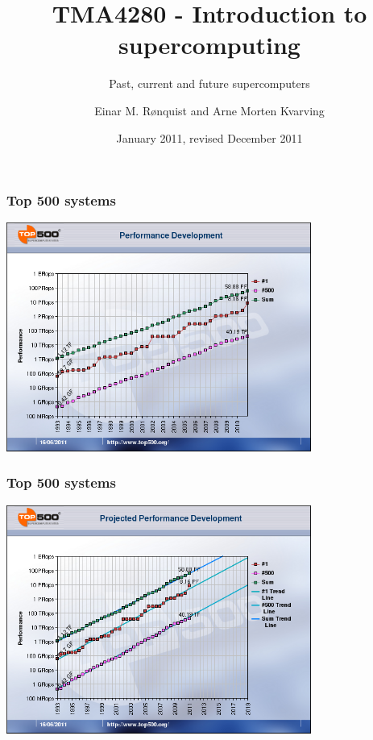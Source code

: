 \documentclass{beamer}
\title{TMA4280 - Introduction to supercomputing}
\subtitle{Past, current and future supercomputers}
\author{Einar M. R{\o}nquist and Arne Morten Kvarving}
\institute{NTNU and SINTEF ICT}
\date{January 2011, revised December 2011}
\begin{document}
\maketitle


\begin{frame}\frametitle{Top 500 systems}
\begin{center}
\includegraphics[width=10cm]{Performance_Development}
\end{center}
\end{frame}

\begin{frame}\frametitle{Top 500 systems}
\begin{center}
\includegraphics[width=10cm]{Projected_Performance_Development}
\end{center}
\end{frame}
\end{document}
